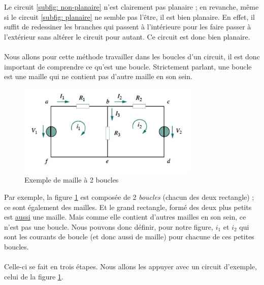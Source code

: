 \documentclass[12pt,a4paper]{article}
\begin{document}
Le circuit \ref{subfig: non-planaire} n'est clairement pas planaire ; en revanche, même si le circuit \ref{subfig: planaire} ne semble pas l'être, il est bien planaire. En effet, il suffit de redessiner les branches qui passent à l'intérieure pour les faire passer à l'extérieur sans altérer le circuit pour autant. Ce circuit est donc bien planaire.\\
\\
 Nous allons pour cette méthode travailler dans les boucles d'un circuit, il est donc important de comprendre ce qu'est une boucle. Strictement parlant, une boucle est une maille qui ne contient pas d'autre maille en son sein.
\begin{figure}[!h]
	\centering
	\includegraphics[scale=0.7]{images/maille_2_boucles}
	\caption{Exemple de maille à 2 boucles}
	\label{fig: maille 2 boucles}
\end{figure}
Par exemple, la figure \ref{fig: maille 2 boucles} est composée de 2 \textit{boucles} (chacun des deux rectangle) ; ce sont également des mailles. Et le grand rectangle, formé des deux plus petits est \uline{aussi} une maille. Mais comme elle contient d'autres mailles en son sein, ce n'est pas une boucle. Nous pouvons donc définir, pour notre figure, $i_1$ et $i_2$ qui sont les courants de boucle (et donc aussi de maille) pour chacune de ces petites boucles.\\
\\
 Celle-ci se fait en trois étapes. Nous allons les appuyer avec un circuit d'exemple, celui de la figure \ref{fig: maille 2 boucles}.
\end{document}
